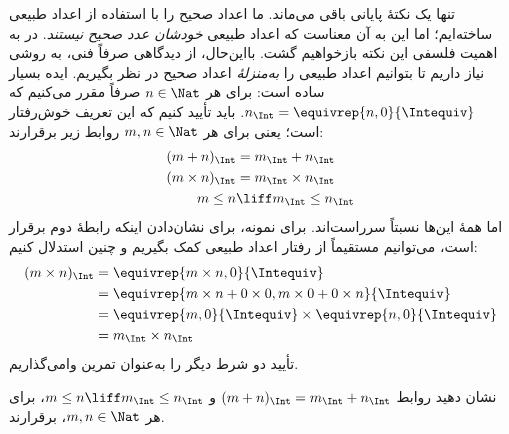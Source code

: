 \documentclass[../../../include/open-logic-section]{subfiles}
\begin{document}
تنها یک نکتهٔ پایانی باقی می‌ماند. ما اعداد صحیح را با استفاده از
اعداد طبیعی ساخته‌ایم؛ اما این به آن معناست که اعداد طبیعی \emph{خودشان
عدد صحیح نیستند}. در  به اهمیت فلسفی این نکته بازخواهیم
گشت. بااین‌حال، از دیدگاهی صرفاً فنی، به روشی نیاز داریم تا بتوانیم
اعداد طبیعی را \emph{به‌منزلهٔ} اعداد صحیح در نظر بگیریم. ایده بسیار ساده
است: برای هر $n \in \Nat$ صرفاً مقرر می‌کنیم که
$n_\Int = \equivrep{n, 0}{\Intequiv}$. باید تأیید کنیم که این تعریف
خوش‌رفتار است؛ یعنی برای هر $m, n \in \Nat$ روابط زیر برقرارند:
\begin{align*}
	(m + n)_\Int &= m_\Int + n_\Int\\
	(m \times n)_\Int &= m_\Int \times n_\Int\\
	m \leq n &\liff m_\Int \leq n_\Int
\end{align*}
اما همهٔ این‌ها نسبتاً سرراست‌اند. برای نمونه، برای نشان‌دادن اینکه
رابطهٔ دوم برقرار است، می‌توانیم مستقیماً از رفتار اعداد طبیعی کمک
بگیریم و چنین استدلال کنیم:
	\begin{align*}
		(m \times n)_\Int  &= \equivrep{m \times n, 0}{\Intequiv} \\
		&= \equivrep{m \times n + 0 \times 0, m \times 0 + 0 \times n}{\Intequiv} \\
		&= \equivrep{m, 0}{\Intequiv} \times \equivrep{n, 0}{\Intequiv} \\
		&= m_\Int \times n_\Int
	\end{align*}
تأیید دو شرط دیگر را به‌عنوان تمرین وامی‌گذاریم.
\begin{prob}
	نشان دهید روابط $(m + n)_\Int = m_\Int + n_\Int$ و $m \leq n \liff m_\Int \leq n_\Int$، برای هر $m, n \in \Nat$، برقرارند.
\end{prob}
\end{document}
